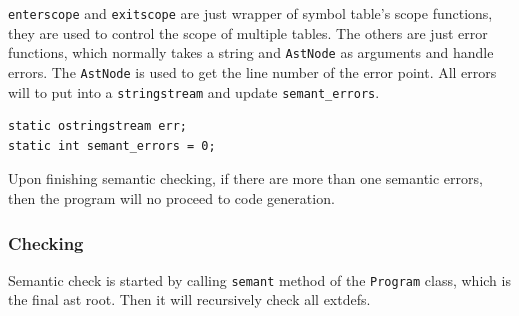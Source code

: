 \documentclass[11pt]{article}
\begin{document}
\texttt{enterscope} and \texttt{exitscope} are just wrapper of symbol table's scope
functions, they are used to control the scope of multiple tables. The others
are just error functions, which normally takes a string and \texttt{AstNode} as
arguments and handle errors. The \texttt{AstNode} is used to get the line number of
the error point. All errors will to put into a \texttt{stringstream} and update
\texttt{semant\_errors}.
\begin{verbatim}
static ostringstream err;
static int semant_errors = 0;
\end{verbatim}
Upon finishing semantic checking, if there are more than one semantic
errors, then the program will no proceed to code generation.

\subsubsection{Checking}
\label{sec:orgheadline11}
Semantic check is started by calling \texttt{semant} method of the \texttt{Program} class,
which is the final ast root. Then it will recursively check all extdefs.
\end{document}
